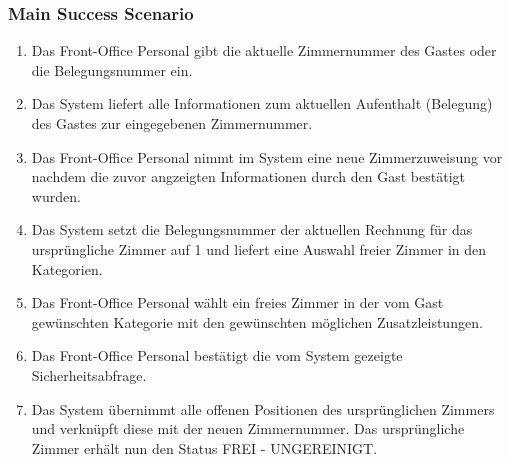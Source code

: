 \documentclass[./detailed_overview_usecases.tex]{subfiles}
\begin{document}
    \subsubsection*{Main Success Scenario}
    \begin{enumerate}
        \item Das Front-Office Personal gibt die aktuelle Zimmernummer des Gastes oder die Belegungsnummer ein.
        \item Das System liefert alle Informationen zum aktuellen Aufenthalt (Belegung) des Gastes zur eingegebenen Zimmernummer.
        \item Das Front-Office Personal nimmt im System eine neue Zimmerzuweisung vor nachdem die zuvor angzeigten Informationen durch den Gast bestätigt wurden.
        \item Das System setzt die Belegungsnummer der aktuellen Rechnung für das ursprüngliche Zimmer auf 1 und liefert eine Auswahl freier Zimmer in den Kategorien.
        \item Das Front-Office Personal wählt ein freies Zimmer in der vom Gast gewünschten Kategorie mit den gewünschten möglichen Zusatzleistungen.
        \item Das Front-Office Personal bestätigt die vom System gezeigte Sicherheitsabfrage.
        \item Das System übernimmt alle offenen Positionen des ursprünglichen Zimmers und verknüpft diese mit der neuen Zimmernummer. Das ursprüngliche Zimmer
        erhält nun den Status FREI - UNGEREINIGT.
    \end{enumerate}
\end{document}

